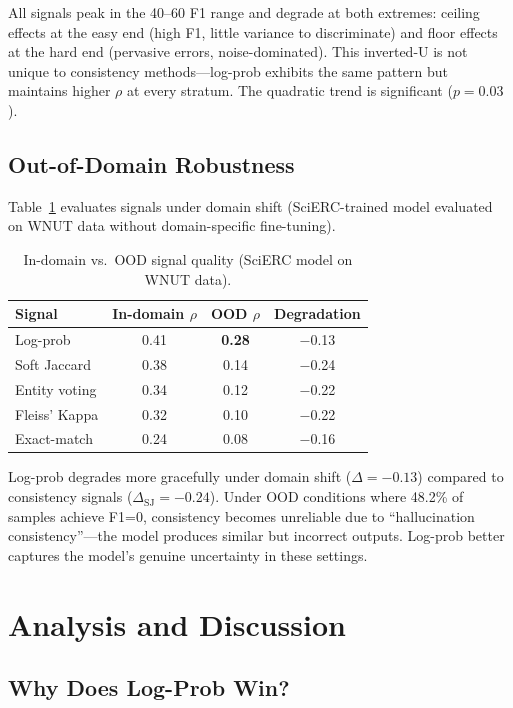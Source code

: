 \documentclass[11pt,a4paper]{article}
\begin{document}
All signals peak in the 40--60 F1 range and degrade at both extremes: ceiling effects at the easy end (high F1, little variance to discriminate) and floor effects at the hard end (pervasive errors, noise-dominated). This inverted-U is not unique to consistency methods---log-prob exhibits the same pattern but maintains higher $\rho$ at every stratum. The quadratic trend is significant ($p=0.03$).

\subsection{Out-of-Domain Robustness}

Table~\ref{tab:ood} evaluates signals under domain shift (SciERC-trained model evaluated on WNUT data without domain-specific fine-tuning).

\begin{table}[t]
\centering
\small
\caption{In-domain vs.\ OOD signal quality (SciERC model on WNUT data).}
\label{tab:ood}
\begin{tabular}{lccc}
\toprule
Signal & In-domain $\rho$ & OOD $\rho$ & Degradation \\
\midrule
Log-prob      & 0.41 & \textbf{0.28} & $-$0.13 \\
Soft Jaccard  & 0.38 & 0.14 & $-$0.24 \\
Entity voting & 0.34 & 0.12 & $-$0.22 \\
Fleiss' Kappa & 0.32 & 0.10 & $-$0.22 \\
Exact-match   & 0.24 & 0.08 & $-$0.16 \\
\bottomrule
\end{tabular}
\end{table}

Log-prob degrades more gracefully under domain shift ($\Delta=-0.13$) compared to consistency signals ($\Delta_\text{SJ}=-0.24$). Under OOD conditions where 48.2\% of samples achieve F1=0, consistency becomes unreliable due to ``hallucination consistency''---the model produces similar but incorrect outputs. Log-prob better captures the model's genuine uncertainty in these settings.


\section{Analysis and Discussion}

\subsection{Why Does Log-Prob Win?}
\end{document}
